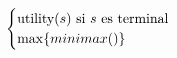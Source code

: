 \documentclass[preview]{standalone}
\begin{document}
\begin{align*}
\begin{cases}\text{utility($s$) si $s$ es terminal} \cr
                                 \max\{minimax()\}\cr
                                 \end{cases}
\end{align*}
\end{document}
